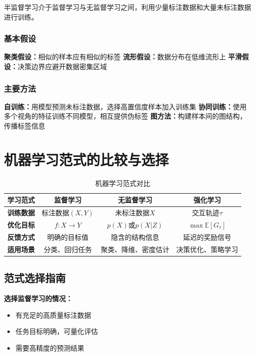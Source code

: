 半监督学习介于监督学习与无监督学习之间，利用少量标注数据和大量未标注数据进行训练。

\subsubsection{基本假设}

\textbf{聚类假设：}相似的样本应有相似的标签
\textbf{流形假设：}数据分布在低维流形上
\textbf{平滑假设：}决策边界应避开数据密集区域

\subsubsection{主要方法}

\textbf{自训练：}用模型预测未标注数据，选择高置信度样本加入训练集
\textbf{协同训练：}使用多个视角的特征训练不同模型，相互提供伪标签
\textbf{图方法：}构建样本间的图结构，传播标签信息

\section{机器学习范式的比较与选择}

\begin{table}[htbp]
\centering
\caption{机器学习范式对比}
\begin{tabular}{|c|c|c|c|}
\hline
\textbf{学习范式} & \textbf{监督学习} & \textbf{无监督学习} & \textbf{强化学习} \\
\hline
\textbf{训练数据} & 标注数据$(X, Y)$ & 未标注数据$X$ & 交互轨迹$\tau$ \\
\hline
\textbf{优化目标} & $f: X \rightarrow Y$ & $p(X)$或$p(X|Z)$ & $\max \mathbb{E}[G_\tau]$ \\
\hline
\textbf{反馈方式} & 明确的目标值 & 隐含的结构信息 & 延迟的奖励信号 \\
\hline
\textbf{适用场景} & 分类、回归任务 & 聚类、降维、密度估计 & 决策优化、策略学习 \\
\hline
\end{tabular}
\end{table}

\subsection{范式选择指南}

\textbf{选择监督学习的情况：}
\begin{itemize}
\item 有充足的高质量标注数据
\item 任务目标明确，可量化评估
\item 需要高精度的预测结果
\end{itemize}

